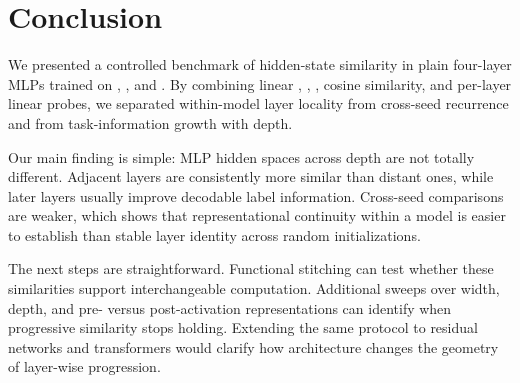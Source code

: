 \section{Conclusion}
\label{sec:conclusion}

We presented a controlled benchmark of hidden-state similarity in plain four-layer MLPs trained on \mnist, \fashionmnist, and \cifar. By combining linear \cka, \svcca, \pwcca, cosine similarity, and per-layer linear probes, we separated within-model layer locality from cross-seed recurrence and from task-information growth with depth.

Our main finding is simple: MLP hidden spaces across depth are not totally different. Adjacent layers are consistently more similar than distant ones, while later layers usually improve decodable label information. Cross-seed comparisons are weaker, which shows that representational continuity within a model is easier to establish than stable layer identity across random initializations.

The next steps are straightforward. Functional stitching can test whether these similarities support interchangeable computation. Additional sweeps over width, depth, and pre- versus post-activation representations can identify when progressive similarity stops holding. Extending the same protocol to residual networks and transformers would clarify how architecture changes the geometry of layer-wise progression.
